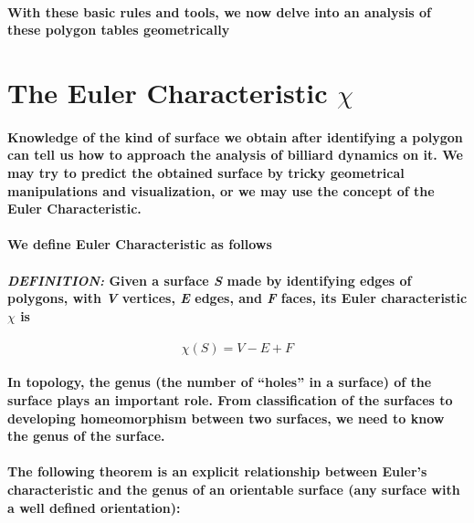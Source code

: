 \documentclass{article}
\begin{document}
\paragraph{With these basic rules and tools, we now delve into an analysis of these polygon tables geometrically}

\section{The Euler Characteristic $\chi$}

\paragraph{Knowledge of the kind of surface we obtain after identifying a polygon can tell us how to approach the analysis of billiard dynamics on it. We may try to predict the obtained surface by tricky geometrical manipulations and visualization, or we may use the concept of the Euler Characteristic.}

\paragraph{We define Euler Characteristic as follows}

\paragraph{\textit{DEFINITION:} Given a surface \textit{S} made by identifying edges of polygons, with \textit{V} vertices, \textit{E} edges, and \textit{F} faces, its Euler characteristic $\chi$ is}

\begin{equation}
\mathit{\chi(S)=V-E+F}
\end{equation}

\paragraph{In topology, the genus (the number of “holes” in a surface) of the surface plays an important role. From classification of the surfaces to developing homeomorphism between two surfaces, we need to know the genus of the surface.}

\paragraph{The following theorem is an explicit relationship between Euler’s characteristic and the genus of an orientable surface (any surface with a well defined orientation):}
\end{document}
